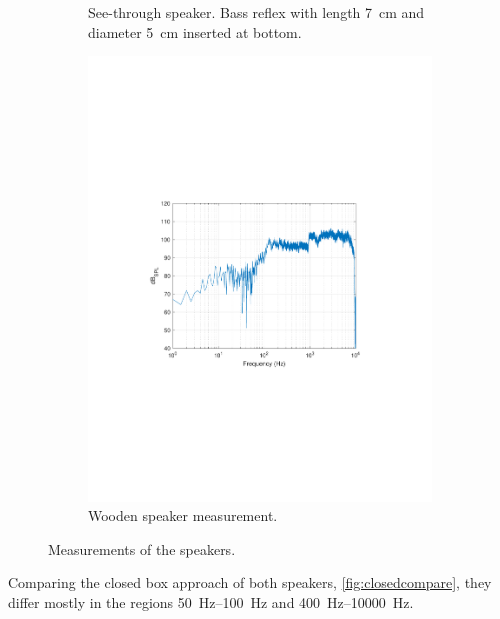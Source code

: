 \begin{figure}
\begin{subfigure}[t]{.5\textwidth}
		\caption{See-through speaker. Bass reflex with length \SI{7}{\centi\metre} and diameter \SI{5}{\centi\metre} inserted at bottom.}
		\label{fig:measPGbass}
	\end{subfigure}%
	\begin{subfigure}[t]{.5\textwidth}
		\centering
		\includegraphics[width=.9\linewidth, clip, trim={3.9cm 8.4cm 4.5cm 9cm}]{gfx/SpeakerMeas/PKclosed.pdf}
		\caption{Wooden speaker measurement.}
		\label{fig:measPK}
	\end{subfigure}
	\caption{Measurements of the speakers.}
	\label{fig:measAll}
\end{figure}

Comparing the closed box approach of both speakers, \cref{fig:closedcompare}, they differ mostly in the regions \SIrange{50}{100}{\hertz} and \SIrange{400}{10000}{\hertz}.


